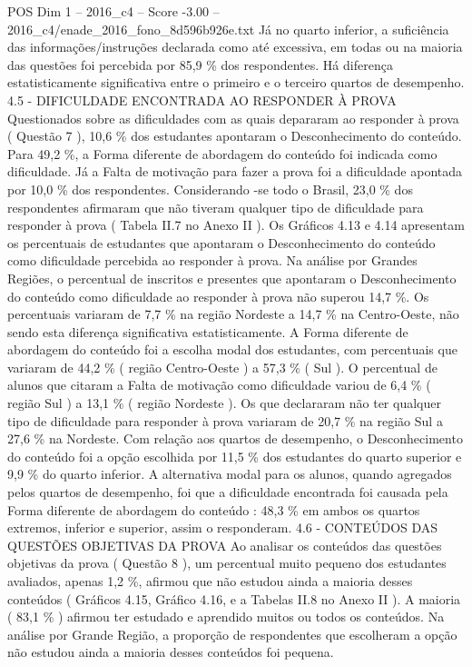\begin{textsample}{POS Dim 1 – 2016\_c4 – Score -3.00 – 2016\_c4/enade\_2016\_fono\_8d596b926e.txt}
Já no quarto inferior, a suficiência das informações/instruções declarada como até excessiva, em todas ou na maioria das questões foi percebida por 85,9 \% dos respondentes.
Há diferença estatisticamente significativa entre o primeiro e o terceiro quartos de desempenho. 4.5 - DIFICULDADE ENCONTRADA AO RESPONDER À PROVA Questionados sobre as dificuldades com as quais depararam ao responder à prova ( Questão 7 ), 10,6 \% dos estudantes apontaram o Desconhecimento do conteúdo.
Para 49,2 \%, a Forma diferente de abordagem do conteúdo foi indicada como dificuldade.
Já a Falta de motivação para fazer a prova foi a dificuldade apontada por 10,0 \% dos respondentes.
Considerando -se todo o Brasil, 23,0 \% dos respondentes afirmaram que não tiveram qualquer tipo de dificuldade para responder à prova ( Tabela II.7 no Anexo II ).
Os Gráficos 4.13 e 4.14 apresentam os percentuais de estudantes que apontaram o Desconhecimento do conteúdo como dificuldade percebida ao responder à prova.
Na análise por Grandes Regiões, o percentual de inscritos e presentes que apontaram o Desconhecimento do conteúdo como dificuldade ao responder à prova não superou 14,7 \%.
Os percentuais variaram de 7,7 \% na região Nordeste a 14,7 \% na Centro-Oeste, não sendo esta diferença significativa estatisticamente.
A Forma diferente de abordagem do conteúdo foi a escolha modal dos estudantes, com percentuais que variaram de 44,2 \% ( região Centro-Oeste ) a 57,3 \% ( Sul ).
O percentual de alunos que citaram a Falta de motivação como dificuldade variou de 6,4 \% ( região Sul ) a 13,1 \% ( região Nordeste ).
Os que declararam não ter qualquer tipo de dificuldade para responder à prova variaram de 20,7 \% na região Sul a 27,6 \% na Nordeste.
Com relação aos quartos de desempenho, o Desconhecimento do conteúdo foi a opção escolhida por 11,5 \% dos estudantes do quarto superior e 9,9 \% do quarto inferior.
A alternativa modal para os alunos, quando agregados pelos quartos de desempenho, foi que a dificuldade encontrada foi causada pela Forma diferente de abordagem do conteúdo : 48,3 \% em ambos os quartos extremos, inferior e superior, assim o responderam. 4.6 - CONTEÚDOS DAS QUESTÕES OBJETIVAS DA PROVA Ao analisar os conteúdos das questões objetivas da prova ( Questão 8 ), um percentual muito pequeno dos estudantes avaliados, apenas 1,2 \%, afirmou que não estudou ainda a maioria desses conteúdos ( Gráficos 4.15, Gráfico 4.16, e a Tabelas II.8 no Anexo II ).
A maioria ( 83,1 \% ) afirmou ter estudado e aprendido muitos ou todos os conteúdos.
Na análise por Grande Região, a proporção de respondentes que escolheram a opção não estudou ainda a maioria desses conteúdos foi pequena.

\end{textsample}
